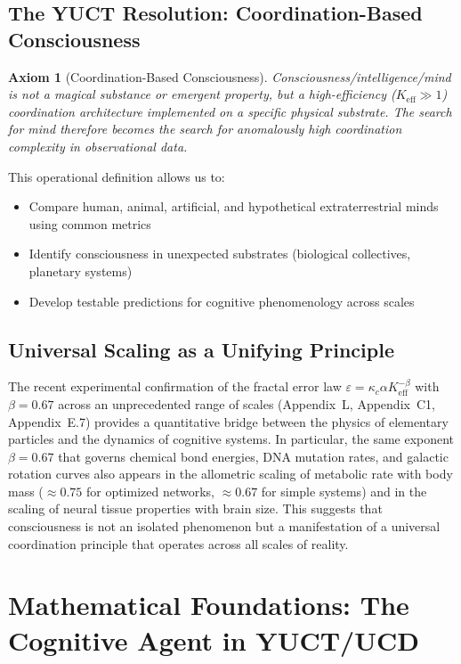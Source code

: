 \documentclass[12pt,a4paper]{article}
\newtheorem{axiom}{Axiom}
\newcommand{\Ke}{K_{\mathrm{eff}}}
\begin{document}
	\subsection{The YUCT Resolution: Coordination-Based Consciousness}
	
	\begin{axiom}[Coordination-Based Consciousness]
		Consciousness/intelligence/mind is not a magical substance or emergent property, but a high-efficiency (\(\Ke \gg 1\)) coordination architecture implemented on a specific physical substrate. The search for mind therefore becomes the search for anomalously high coordination complexity in observational data.
	\end{axiom}
	
	This operational definition allows us to:
	\begin{itemize}
		\item Compare human, animal, artificial, and hypothetical extraterrestrial minds using common metrics
		\item Identify consciousness in unexpected substrates (biological collectives, planetary systems)
		\item Develop testable predictions for cognitive phenomenology across scales
	\end{itemize}
	
	\subsection{Universal Scaling as a Unifying Principle}
	\label{subsec:universal-scaling}
	
	The recent experimental confirmation of the fractal error law \(\varepsilon = \kappa_c \alpha \Ke^{-\beta}\) with \(\beta = 0.67\) across an unprecedented range of scales (Appendix~L, Appendix~C1, Appendix~E.7) provides a quantitative bridge between the physics of elementary particles and the dynamics of cognitive systems. In particular, the same exponent \(\beta = 0.67\) that governs chemical bond energies, DNA mutation rates, and galactic rotation curves also appears in the allometric scaling of metabolic rate with body mass (\(\approx 0.75\) for optimized networks, \(\approx 0.67\) for simple systems) and in the scaling of neural tissue properties with brain size. This suggests that consciousness is not an isolated phenomenon but a manifestation of a universal coordination principle that operates across all scales of reality.
	
	\section{Mathematical Foundations: The Cognitive Agent in YUCT/UCD}
	
\end{document}
